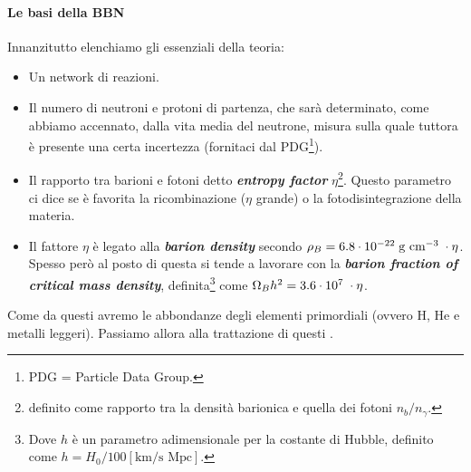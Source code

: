 
\paragraph{Le basi della BBN} Innanzitutto elenchiamo gli  essenziali della teoria:
\begin{itemize}
    \item Un network di reazioni.
    \item Il numero di neutroni e protoni di partenza, che sarà determinato, come abbiamo accennato, dalla vita media del neutrone, misura sulla quale tuttora è presente una certa incertezza (fornitaci dal PDG\footnote{PDG = Particle Data Group.}).
    \item Il rapporto tra barioni e fotoni detto \textbf{\textit{entropy factor}} $\eta$\footnote{ definito come rapporto tra la densità barionica e quella dei fotoni $n_b/n_\gamma$.}. Questo parametro ci dice se è favorita la ricombinazione ($\eta$ grande) o la fotodisintegrazione della materia.
    \item Il fattore $\eta$ è legato alla \textbf{\textit{barion density}} secondo $\rho_B = 6.8\cdot10^{-22}\;\mbox{g cm}^{-3}\; \cdot \eta$. Spesso però al posto di questa si tende a lavorare con la \textbf{\textit{barion fraction of critical mass density}}, definita\footnote{Dove $h$ è un parametro adimensionale per la costante di Hubble, definito come $h=H_0/100 [\mbox{km}/\mbox{s Mpc}]$.} come $\Omega_B h^2= 3.6 \cdot10^{7}\;\cdot \eta$.
\end{itemize}
Come  da questi avremo le abbondanze degli elementi primordiali (ovvero H, He e metalli leggeri). Passiamo allora alla trattazione di questi .

